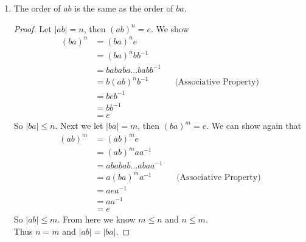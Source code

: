 \documentclass[12pt]{article}
\begin{document}
\begin{enumerate}[label=\textbf{\arabic*}.]
\begin{enumerate}
\begin{proof}
            $n \leq |g^{-1}ag| \leq n$. Therefore $|g^{-1}ag| = n = |a|$.
        \end{proof}
        \item The order of $ab$ is the same as the order of $ba$.
        \begin{proof} Let $|ab| = n$, then ${(ab)}^{n} = e$. We show
            \begin{align*}
                {(ba)}^n &= {(ba)}^{n}e \\
                         &= {(ba)}^{n}bb^{-1} \\
                         &= bababa \dots babb^{-1} \\
                         &= b{(ab)}^{n}b^{-1} && \text{(Associative Property)} \\
                         &= beb^{-1} \\
                         &= bb^{-1} \\
                         &= e
            \end{align*}
            So $|ba| \leq n$. Next we let $|ba| = m$, then ${(ba)}^m = e$. We can show again that
            \begin{align*}
                {(ab)}^m &= {(ab)}^{m}e \\
                         &= {(ab)}^{m}aa^{-1} \\
                         &= ababab \dots abaa^{-1} \\
                         &= a{(ba)}^{m}a^{-1} && \text{(Associative Property)} \\
                         &= aea^{-1} \\
                         &= aa^{-1} \\
                         &= e
            \end{align*}
            So $|ab| \leq m$. From here we know $m \leq n$ and $n \leq m$. \\
            Thus $n=m$ and $|ab| = |ba|$.
        \end{proof}
    \end{enumerate}
\end{enumerate}
\end{document}
